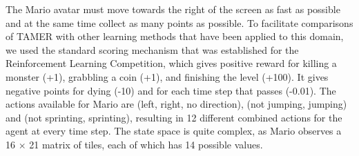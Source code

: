 \documentclass[10pt,journal,compsoc]{IEEEtran}
\begin{document}
The Mario avatar must move towards the right of the screen as fast as possible %
and at the same time collect as many points as possible. To facilitate comparisons of TAMER with other learning methods that have been applied to this domain, we used the standard scoring mechanism that was established for the Reinforcement Learning Competition, which gives positive reward for killing a monster (+1), grabbling a coin (+1), and finishing the level (+100).  It gives negative points for dying (-10) and for each time step that passes (-0.01). The actions available for Mario %
are (left, right, no direction), (not jumping, jumping) and (not sprinting, sprinting), resulting in 12 different combined actions for the agent at every time step. The state space is quite complex, as Mario observes a 16 $\times$ 21 matrix of tiles, each of which has 14 possible values. 
\end{document}
